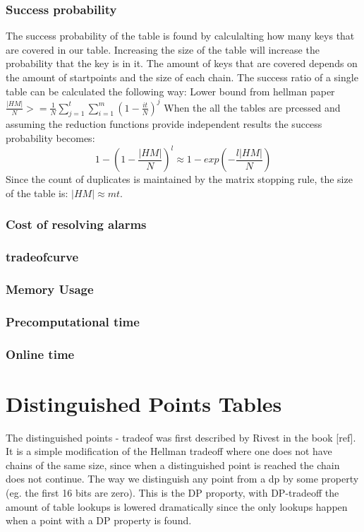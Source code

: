 \subsubsection*{Success probability}
The success probability of the table is found by calculalting how many keys that are covered in our table. Increasing the size of the table will increase the probability that the key is in it. The amount of keys that are covered depends on the amount of startpoints and the size of each chain. The success ratio of a single table can be calculated the following way:
Lower bound from hellman paper
$\frac{|HM|}{N}>=\frac{1}{N}\sum^{t}_{j=1}\sum^{m}_{i=1}(1-\frac{it}{N})^{j} $
When the all the tables are prcessed and assuming the reduction functions provide independent results the success probability becomes:
\begin{equation}
1-(1-\frac{|HM|}{N})^l\approx 1- exp(-\frac{l|HM|}{N})
\end{equation}
Since the count of duplicates is maintained by the matrix stopping rule, the size of the table is: $|HM|\approx mt$.
\subsubsection{Cost of resolving alarms}
\subsubsection{tradeofcurve}
\subsubsection{Memory Usage}
\subsubsection{Precomputational time}
\subsubsection{Online time}

\section{Distinguished Points Tables}
The distinguished points - tradeof was first described by Rivest in
the book [ref]. It is a simple modification of the Hellman tradeoff
where one does not have chains of the same size, since when a
distinguished point is reached the chain does not continue. The way we distinguish any point from a dp by some property (eg. the first 16 bits are zero). This is the DP proporty, with DP-tradeoff the amount of table lookups is lowered dramatically since the only lookups happen when a point with a DP property is found.
